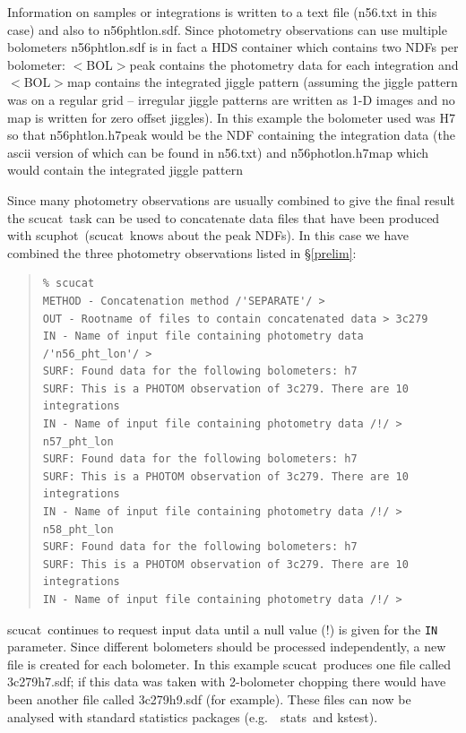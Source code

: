\documentclass[twoside,11pt]{article}
\newcommand{\Kappa}{\xref{{\sc{Kappa}}}{sun95}{}}
\newcommand{\task}[1]{{\sf #1}}
\newcommand{\param}[1]{{\tt #1}}
\newcommand{\scuphot}{\htmlref{\task{scuphot}}{SCUPHOT}}
\newcommand{\scucat}{\htmlref{\task{scucat}}{SCUCAT}}
\newcommand{\kstest}{\xref{\task{kstest}}{sun95}{KSTEST}}
\newcommand{\stats}{\xref{\task{stats}}{sun95}{STATS}}
\newenvironment{myquote}{\begin{quote}\begin{small}}{\end{small}\end{quote}}
\newcommand{\htmlref}[2]{#1}
\newcommand{\xref}[3]{#1}
\renewcommand{\_}{\texttt{\symbol{95}}}
\begin{document}
Information on samples or integrations is written to a text file (n56.txt in
this case) and also to n56\_pht\_lon.sdf. Since photometry observations can
use multiple bolometers n56\_pht\_lon.sdf is in fact a HDS container
\cite{hds} which contains two NDFs per bolometer: $<$BOL$>$\_peak contains the
photometry data for each integration and $<$BOL$>$\_map contains the
integrated jiggle pattern (assuming the jiggle pattern was on a regular grid
-- irregular jiggle patterns are written as 1-D images and no map is written
for zero offset jiggles).  In this example the bolometer used was H7 so that
n56\_pht\_lon.h7\_peak would be the NDF containing the integration data (the
ascii version of which can be found in n56.txt) and n56\_phot\_lon.h7\_map
which would contain the integrated jiggle pattern



Since many photometry observations are usually combined to give the final
result the \scucat\ task can be used to concatenate data files that have been
produced with \scuphot\ (\scucat\ knows about the \_peak NDFs). In this
case we have combined the three photometry observations listed in
\S\ref{prelim}:

\begin{myquote}
\begin{verbatim}
% scucat 
METHOD - Concatenation method /'SEPARATE'/ > 
OUT - Rootname of files to contain concatenated data > 3c279
IN - Name of input file containing photometry data /'n56_pht_lon'/ >
SURF: Found data for the following bolometers: h7
SURF: This is a PHOTOM observation of 3c279. There are 10 integrations
IN - Name of input file containing photometry data /!/ > n57_pht_lon
SURF: Found data for the following bolometers: h7
SURF: This is a PHOTOM observation of 3c279. There are 10 integrations
IN - Name of input file containing photometry data /!/ > n58_pht_lon
SURF: Found data for the following bolometers: h7
SURF: This is a PHOTOM observation of 3c279. There are 10 integrations
IN - Name of input file containing photometry data /!/ > 
\end{verbatim}
\end{myquote}

\scucat\ continues to request input data until a null value (!) is given for
the \param{IN} parameter. Since different bolometers should be processed
independently, a new file is created for each bolometer. In this example
\scucat\ produces one file called 3c279\_h7.sdf; if this data was taken with
2-bolometer chopping there would have been another file called 3c279\_h9.sdf
(for example). These files can now be analysed with standard statistics
packages (e.g.\ \Kappa\ \stats\ and \kstest).
\end{document}
